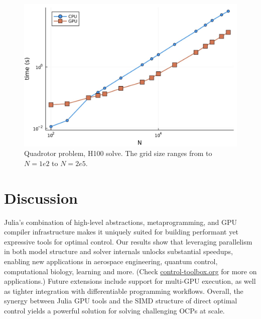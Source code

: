 \begin{figure}
\includegraphics[width=.45\textwidth]{quadrotor-h100.jpg}
\caption{Quadrotor problem, H100 solve. The grid size ranges from to $N = 1e2$ to $N = 2e5$.}
\label{fig4}
\end{figure}


\section{Discussion}
Julia’s combination of high-level abstractions, metaprogramming, and GPU compiler infrastructure makes it uniquely suited for building performant yet expressive tools for optimal control.  
Our results show that leveraging parallelism in both model structure and solver internals unlocks substantial speedups, enabling new applications in aerospace engineering, quantum control, computational biology, learning and more. (Check \href{https://control-toolbox.org}{control-toolbox.org} for more on applications.)
Future extensions include support for multi-GPU execution, as well as tighter integration with differentiable programming workflows.
Overall, the synergy between Julia GPU tools and the SIMD structure of direct optimal control yields a powerful solution for solving challenging OCPs at scale.

